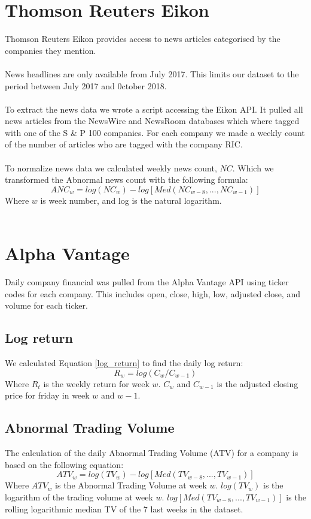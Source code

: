\section{Thomson Reuters Eikon}
Thomson Reuters Eikon provides access to news articles categorised by the companies they mention.
\\\\
News headlines are only available from July 2017. This limits our dataset to the period between July 2017 and 0ctober 2018.
\\\\
To extract the news data we wrote a script accessing the Eikon API. It pulled all news articles from the NewsWire and NewsRoom databases which where tagged with one of the S \& P 100 companies. For each company we made a weekly count of the number of articles who are tagged with the company RIC.
\\\\
To normalize news data we calculated weekly news count, $NC$. Which we transformed the Abnormal news count with the following formula:
\begin{equation}
   \label{abnormal_news} 
   ANC_{w} = log(NC_{w}) - log[Med(NC_{w-8},...,NC_{w-1})] 
\end{equation}
Where $w$ is week number, and log is the natural logarithm.
\\\\
\section{Alpha Vantage}
Daily company financial was pulled from the Alpha Vantage API using ticker codes for each company. This includes open, close, high, low, adjusted close, and volume for each ticker. 
\subsection{Log return}
We calculated Equation \eqref{log_return} to find the daily log return:
\begin{equation}
   \label{log_return} 
   R_w = log (C_w/C_{w-1}) 
\end{equation}
Where $R_t$ is the weekly return for week $w$. $C_w$ and  $C_{w-1}$ is the adjusted closing price for friday in week $w$ and $w-1$. 

\subsection{Abnormal Trading Volume}
The calculation of the daily Abnormal Trading Volume (ATV) for a company is based on the following equation: 
\begin{equation}
   \label{abnormal_volume} 
   ATV_{w} = log(TV_{w}) - log[Med(TV_{w-8},...,TV_{w-1})] 
\end{equation}
   Where $ATV_w$ is the Abnormal Trading Volume at week $w$. $log(TV_{w})$ is the logarithm of the trading volume at week $w$. $log[Med(TV_{w-8},...,TV_{w-1})]$ is the rolling logarithmic median TV of the 7 last weeks in the dataset.


